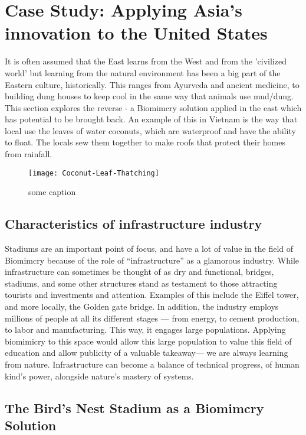 \section{Case Study: Applying Asia's innovation to the United States}

It is often assumed that the East learns from the West and from the 'civilized world' but learning from the natural environment has been a big part of the Eastern culture, historically. This ranges from Ayurveda and ancient medicine, to building dung houses to keep cool in the same way that animals use mud/dung. This section explores the reverse - a Biomimcry solution applied in the east which has potential to be brought back. An example of this in Vietnam is the way that local use the leaves of water coconuts, which are waterproof and have the ability to float. The locals sew them together to make roofs that protect their homes from rainfall.

\begin{figure}[h]
\texttt{[image: Coconut-Leaf-Thatching]}
\caption{some caption}
\label{fig:Coconut-Leaf-Thatching}
\end{figure}

\subsection{Characteristics of infrastructure industry}

Stadiums are an important point of focus, and have a lot of value in the field of Biomimcry because of the role of ``infrastructure'' as a glamorous industry. While infrastructure can sometimes be thought of as dry and functional, bridges, stadiums, and some other structures stand as testament to those attracting tourists and investments and attention. Examples of this include the Eiffel tower, and more locally, the Golden gate bridge. In addition, the industry employs millions of people at all its different stages --- from energy, to cement production, to labor and manufacturing. This way, it engages large populations. Applying biomimicry to this space would allow this large population to value this field of education and allow publicity of a valuable takeaway--- we are always learning from nature. Infrastructure can become a balance of technical progress, of human kind's power, alongside nature's mastery of systems.

\subsection{The Bird's Nest Stadium as a Biomimcry Solution}

